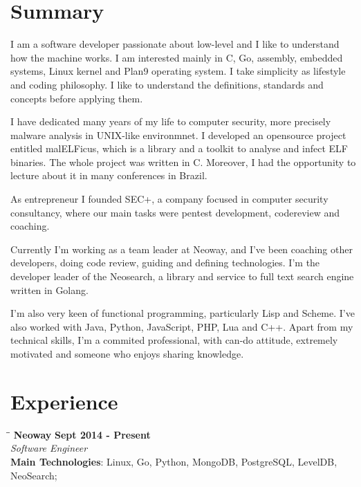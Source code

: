 \documentclass[margin]{res}
\begin{document}
  

\address{Florianopolis, SC, Brazil\\ tiago4orion@gmail.com \\ Phone: +55 4891051337 \\ Post Code: 88064-612 }
                           
                        
\begin{resume}                        
 
\section{Summary}   I am a software developer passionate about low-level and I like to understand how the machine works. I am interested mainly in C, Go, assembly, embedded systems, Linux kernel and Plan9 operating system. I take simplicity as lifestyle and coding philosophy. I like to understand the definitions, standards and concepts before applying them.

I have dedicated many years of my life to computer security, more precisely malware analysis in UNIX-like environmnet. I developed an opensource project entitled malELFicus, which is a library and a toolkit to analyse and infect ELF binaries. The whole project was written in C. Moreover, I had the opportunity to lecture about it in many conferences in Brazil.

As entrepreneur I founded SEC+, a company focused in computer security consultancy, where our main tasks were pentest development, codereview and coaching.

Currently I'm working as a team leader at Neoway, and I've been coaching other developers, doing code review, guiding and defining technologies. I'm the developer leader of the Neosearch, a library and service to full text search engine written in Golang.

I'm also  very keen of functional programming, particularly Lisp and Scheme. I've also worked with Java, Python, JavaScript, PHP, Lua and C++. Apart from my technical skills, I'm a commited professional, with can-do attitude, extremely motivated and someone who enjoys sharing knowledge. 

\section{Experience}

\vspace{-0.1in}
   \begin{tabbing}
   \hspace{2.3in}\= \hspace{1.7in}\= \kill %
    \textbf{Neoway}    \>\>\textbf{Sept 2014 - Present}\\
    \textit{Software Engineer}\\        
    \textbf{Main Technologies}: Linux, Go, Python, MongoDB, PostgreSQL, LevelDB, NeoSearch;
   \end{tabbing}\vspace{-20pt}      %
    \vspace{2mm}
  

\end{resume}
\end{document}
